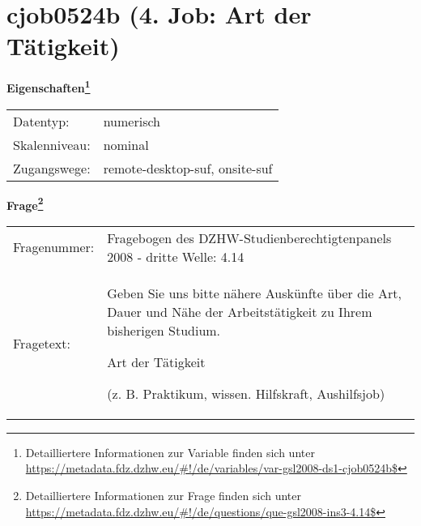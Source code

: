 
    \setcounter{footnote}{0}

    \vspace*{-1.8cm}
	\section{cjob0524b (4. Job: Art der Tätigkeit)}
	\label{section:cjob0524b}



    \vspace*{0.5cm}
    \noindent\textbf{Eigenschaften\footnote{Detailliertere Informationen zur Variable finden sich unter
		\url{https://metadata.fdz.dzhw.eu/\#!/de/variables/var-gsl2008-ds1-cjob0524b$}}}\\
	\begin{tabularx}{\hsize}{@{}lX}
	Datentyp: & numerisch \\
	Skalenniveau: & nominal \\
	Zugangswege: &
	  remote-desktop-suf, 
	  onsite-suf
 \\
    \end{tabularx}



				\vspace*{0.5cm}
                \noindent\textbf{Frage\footnote{Detailliertere Informationen zur Frage finden sich unter
		              \url{https://metadata.fdz.dzhw.eu/\#!/de/questions/que-gsl2008-ins3-4.14$}}}\\
				\begin{tabularx}{\hsize}{@{}lX}
					Fragenummer: &
					  Fragebogen des DZHW-Studienberechtigtenpanels 2008 - dritte Welle:
					  4.14
 \\
					Fragetext: & Geben Sie uns bitte nähere Auskünfte über die Art, Dauer und Nähe der Arbeitstätigkeit zu Ihrem bisherigen Studium.\par  Art der Tätigkeit\par  (z. B. Praktikum, wissen. Hilfskraft, Aushilfsjob) \\
				\end{tabularx}





